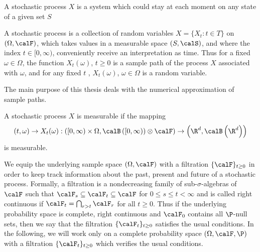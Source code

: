 
	A stochastic process $X$ is a system which could stay at each moment on any state of a given set $S$
\begin{dfn}
	A stochastic process is a collection of random variables $X=\{X_t: t \in T\}$ on $(\Omega,
	\calF)$,  which takes values in a measurable space $(S,\calS)$, and where the index $t\in [0,\infty)$, 
	conveniently receive an interpretation as time. Thus for a fixed $\omega \in \Omega$, the function
	$X_t(\omega)$, $t\geq 0$ is a sample path of the process $X$ associated with $\omega$,  and for any
	fixed $t$ , $X_t(\omega)$, $\omega \in \Omega$ is a random variable. 

\end{dfn}
 The main purpose of this thesis deals with the numerical approximation of sample paths.
\begin{definition}
	A stochastic process $X$ is measurable if the mapping
	\begin{equation*}
		(t, \omega) \to X_t(\omega):
		\left(
			[0,\infty)\times \Omega,
			\calB \left(
				[0,\infty)
			\right) \otimes \calF
		\right)
		\to 
		\left(
			\R^d, \calB \left (\R^d \right)
		\right)
	\end{equation*}
	is measurable.
\end{definition}
%
	We equip the underlying sample space $(\Omega, \calF)$ with a filtration $\{\calF\}_{t\geq 0}$ in order to 
keep track information about the past, present and future of a stochastic process. Formally, a filtration is
a nondecreasing family of sub-$\sigma$-algebras of $\calF$ such that 
$\calF_s\subseteq \calF_t \subseteq \calF$ for $0\leq s \leq t <\infty$ and is called right continuous if
$ %
	\calF_t = \bigcap_{r>t} \calF_r
$
for all $t\geq 0$. Thus if the underlying probability space is complete,
right continuous and $\calF_0$ contains all $\P$-null sets, then we say that the filtration
$\{ \calF_t\}_{t\geq 0}$ satisfies the usual conditions. In the following, we will work only on a
complete probability space $(\Omega, \calF, \P)$  with a filtration $\{\calF_t \}_{t \geq 0}$ which verifies
the usual conditions.
	
